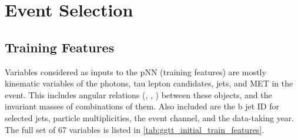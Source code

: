 \section{Event Selection}\label{sec:ggtt_event_selection}

\subsection{Training Features}\label{sec:training_features}

Variables considered as inputs to the pNN (training features) are mostly kinematic variables of the photons, tau lepton candidates, jets, and MET in the event. This includes angular relations (\deta, \dphi, \dR) between these objects, and the invariant masses of combinations of them. Also included are the b jet ID for selected jets, particle multiplicities, the event channel, and the data-taking year. The full set of 67 variables is listed in \cref{tab:ggtt_initial_train_features}.

